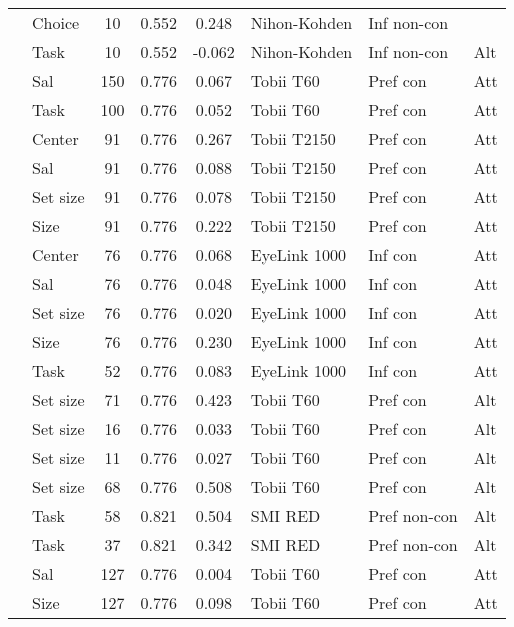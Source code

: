 \begin{longtable}{p{5cm}lccclll}
  \cite{nittono2009} & Choice & 10 & 0.552 & 0.248 & Nihon-Kohden & Inf non-con &  \\ 
  \cite{nittono2009} & Task & 10 & 0.552 & -0.062 & Nihon-Kohden & Inf non-con & Alt \\ 
  \cite{orquin2015a} & Sal & 150 & 0.776 & 0.067 & Tobii T60 & Pref con & Att \\ 
  \cite{orquin2015a} & Task & 100 & 0.776 & 0.052 & Tobii T60 & Pref con & Att \\ 
  \cite{orquin2019a} & Center & 91 & 0.776 & 0.267 & Tobii T2150 & Pref con & Att \\ 
  \cite{orquin2019a} & Sal & 91 & 0.776 & 0.088 & Tobii T2150 & Pref con & Att \\ 
  \cite{orquin2019a} & Set size & 91 & 0.776 & 0.078 & Tobii T2150 & Pref con & Att \\ 
  \cite{orquin2019a} & Size & 91 & 0.776 & 0.222 & Tobii T2150 & Pref con & Att \\ 
  \cite{orquin2019a} & Center & 76 & 0.776 & 0.068 & EyeLink 1000 & Inf con & Att \\ 
  \cite{orquin2019a} & Sal & 76 & 0.776 & 0.048 & EyeLink 1000 & Inf con & Att \\ 
  \cite{orquin2019a} & Set size & 76 & 0.776 & 0.020 & EyeLink 1000 & Inf con & Att \\ 
  \cite{orquin2019a} & Size & 76 & 0.776 & 0.230 & EyeLink 1000 & Inf con & Att \\ 
  \cite{orquin2019a} & Task & 52 & 0.776 & 0.083 & EyeLink 1000 & Inf con & Att \\ 
  \cite{orquin2020osfb} & Set size & 71 & 0.776 & 0.423 & Tobii T60 & Pref con & Alt \\ 
  \cite{orquin2020osfb} & Set size & 16 & 0.776 & 0.033 & Tobii T60 & Pref con & Alt \\ 
  \cite{orquin2020osfb} & Set size & 11 & 0.776 & 0.027 & Tobii T60 & Pref con & Alt \\ 
  \cite{orquin2020osfb} & Set size & 68 & 0.776 & 0.508 & Tobii T60 & Pref con & Alt \\ 
  \cite{paernamets2015a} & Task & 58 & 0.821 & 0.504 & SMI RED & Pref non-con & Alt \\ 
  \cite{paernamets2015a} & Task & 37 & 0.821 & 0.342 & SMI RED & Pref non-con & Alt \\ 
  \cite{peschel2019} & Sal & 127 & 0.776 & 0.004 & Tobii T60 & Pref con & Att \\ 
  \cite{peschel2019} & Size & 127 & 0.776 & 0.098 & Tobii T60 & Pref con & Att \\ 

\end{longtable}
